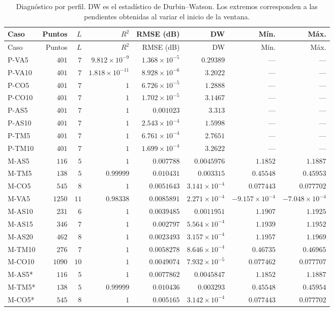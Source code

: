 \begin{longtable}{lrrrrrrr}
\caption{Diagnóstico por perfil. DW es el estadístico de Durbin--Watson. Los extremos corresponden a las pendientes obtenidas al variar el inicio de la ventana.}\label{t:diag}\\
\hline Caso & Puntos & $L$ & $R^2$ & RMSE (dB) & DW & Mín. & Máx. \\ \hline\endfirsthead
\hline Caso & Puntos & $L$ & $R^2$ & RMSE (dB) & DW & Mín. & Máx. \\ \hline\endhead
P-VA5 & $401$ & $7$ & $9.812\times 10^{-9}$ & $1.368\times 10^{-5}$ & $0.29389$ & --- & --- \\
P-VA10 & $401$ & $7$ & $1.818\times 10^{-11}$ & $8.928\times 10^{-6}$ & $3.2022$ & --- & --- \\
P-CO5 & $401$ & $7$ & $1$ & $6.726\times 10^{-5}$ & $1.2888$ & --- & --- \\
P-CO10 & $401$ & $7$ & $1$ & $1.702\times 10^{-5}$ & $3.1467$ & --- & --- \\
P-AS5 & $401$ & $7$ & $1$ & $0.001023$ & $3.313$ & --- & --- \\
P-AS10 & $401$ & $7$ & $1$ & $2.543\times 10^{-4}$ & $1.5998$ & --- & --- \\
P-TM5 & $401$ & $7$ & $1$ & $6.761\times 10^{-4}$ & $2.7651$ & --- & --- \\
P-TM10 & $401$ & $7$ & $1$ & $1.699\times 10^{-4}$ & $3.2622$ & --- & --- \\
M-AS5 & $116$ & $5$ & $1$ & $0.007788$ & $0.0045976$ & $1.1852$ & $1.1887$ \\
M-TM5 & $138$ & $5$ & $0.99999$ & $0.010431$ & $0.003315$ & $0.45548$ & $0.45953$ \\
M-CO5 & $545$ & $8$ & $1$ & $0.0051643$ & $3.141\times 10^{-4}$ & $0.077443$ & $0.077702$ \\
M-VA5 & $1250$ & $11$ & $0.98338$ & $0.0085891$ & $2.271\times 10^{-4}$ & $-9.157\times 10^{-4}$ & $-7.048\times 10^{-4}$ \\
M-AS10 & $231$ & $6$ & $1$ & $0.0039485$ & $0.0011951$ & $1.1907$ & $1.1925$ \\
M-AS15 & $346$ & $7$ & $1$ & $0.002797$ & $5.564\times 10^{-4}$ & $1.1939$ & $1.1952$ \\
M-AS20 & $462$ & $8$ & $1$ & $0.0023493$ & $3.157\times 10^{-4}$ & $1.1957$ & $1.1969$ \\
M-TM10 & $276$ & $7$ & $1$ & $0.0058278$ & $8.646\times 10^{-4}$ & $0.46735$ & $0.46965$ \\
M-CO10 & $1090$ & $10$ & $1$ & $0.0049074$ & $7.932\times 10^{-5}$ & $0.077462$ & $0.077707$ \\
M-AS5* & $116$ & $5$ & $1$ & $0.0077862$ & $0.0045847$ & $1.1852$ & $1.1887$ \\
M-TM5* & $138$ & $5$ & $0.99999$ & $0.010436$ & $0.003293$ & $0.45548$ & $0.45954$ \\
M-CO5* & $545$ & $8$ & $1$ & $0.005165$ & $3.142\times 10^{-4}$ & $0.077443$ & $0.077702$ \\
\hline\end{longtable}\endgroup
